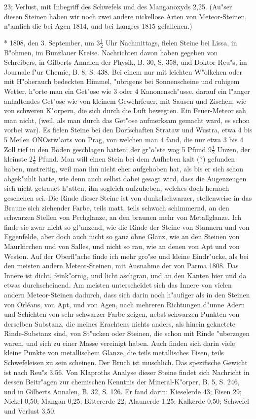\documentclass[a4paper, 11pt, oneside, polutonikogreek, german]{article}
\begin{document}
23; Verlust, mit Inbegriff des Schwefels und des Manganoxyds 2,25. (Au"ser diesen Steinen haben wir noch zwei andere nickellose Arten von Meteor-Steinen, n"amlich die bei Agen 1814, und bei Langres 1815 gefallenen.)

* 1808, den 3. September, um $\mathfrak{3\frac{1}{2}}$ Uhr Nachmittags, fielen Steine bei Lissa, in B"ohmen, im Bunzlauer Kreise. Nachrichten davon haben gegeben von Schreibers, in Gilberts Annalen der Physik, B. 30, S. 358, und Doktor Reu"s, im Journale f"ur Chemie, B. 8, S. 438. Bei einem nur mit leichten W"olkchen oder mit H"oherauch bedeckten Himmel, "ubrigens bei Sonnenscheine und ruhigem Wetter, h"orte man ein Get"ose wie 3 oder 4 Kanonensch"usse, darauf ein l"anger anhaltendes Get"ose wie von kleinem Gewehrfeuer, mit Sausen und Zischen, wie von schweren K"orpern, die sich durch die Luft bewegten. Ein Feuer-Meteor sah man nicht, (weil, als man durch das Get"ose aufmerksam gemacht ward, es schon vorbei war). Es fielen Steine bei den Dorfschaften Strataw und Wustra, etwa 4 bis 5 Meilen ONOstw"arts von Prag, von welchen man 4 fand, die nur etwa 3 bis 4 Zoll tief in den Boden geschlagen hatten; der gr"o"ste wog 5 Pfund $\mathfrak{9\frac{1}{2}}$ Unzen, der kleinste $\mathfrak{2\frac{1}{2}}$ Pfund. Man will einen Stein bei dem Aufheben kalt (?) gefunden haben, unstreitig, weil man ihn nicht eher aufgehoben hat, als bis er sich schon abgek"uhlt hatte, wie denn auch selbst dabei gesagt wird, dass die Augenzeugen sich nicht getrauet h"atten, ihn sogleich aufzuheben, welches doch hernach geschehen sei. Die Rinde dieser Steine ist von dunkelschwarzer, stellenweise in das Braune sich ziehender Farbe, teils matt, teils schwach schimmernd, an den schwarzen Stellen von Pechglanze, an den braunen mehr von Metallglanze. Ich finde sie zwar nicht so gl"anzend, wie die Rinde der Steine von Stannern und von Eggenfelde, aber doch auch nicht so ganz ohne Glanz, wie an den Steinen von Maurkirchen und von Salles, und nicht so rau, wie an denen von Apt und von Weston. Auf der Oberfl"ache finde ich mehr gro"se und kleine Eindr"ucke, als bei den meisten andern Meteor-Steinen, mit Ausnahme der von Parma 1808. Das Innere ist dicht, feink"ornig, und licht aschgrau, und an den Kanten hier und da etwas durchscheinend. Am meisten unterscheidet sich das Innere von vielen andern Meteor-Steinen dadurch, dass sich darin noch h"aufiger als in den Steinen von Orléans, von Apt, und von Agen, nach mehreren Richtungen d"unne Adern und Schichten von sehr schwarzer Farbe zeigen, nebst schwarzen Punkten von derselben Substanz, die meines Erachtens nichts anders, als hinein geknetete Rinde-Substanz sind, von St"ucken oder Steinen, die schon mit Rinde "uberzogen waren, und sich zu einer Masse vereinigt haben. Auch finden sich darin viele kleine Punkte von metallischem Glanze, die teils metallisches Eisen, teils Schwefeleisen zu sein scheinen. Der Bruch ist muschlich. Das spezifische Gewicht ist nach Reu"s 3,56. Von Klaproths Analyse dieser Steine findet sich Nachricht in dessen Beitr"agen zur chemischen Kenntnis der Mineral-K"orper, B. 5, S. 246, und in Gilberts Annalen, B. 32, S. 126. Er fand darin: Kieselerde 43; Eisen 29; Nickel 0,50; Mangan 0,25; Bittererde 22; Alaunerde 1,25; Kalkerde 0,50; Schwefel und Verlust 3,50.
\end{document}
